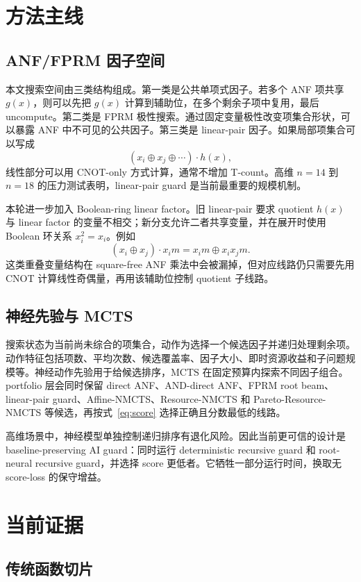 \documentclass[UTF8,fontset=macnew,11pt]{ctexart}
\newcommand{\method}{Resource-NMCTS}
\newcommand{\pareto}{Pareto-Resource-NMCTS}
\newcommand{\mcts}{\ensuremath{\mathrm{MCTS}}}
\begin{document}
\section{方法主线}

\subsection{ANF/FPRM 因子空间}

本文搜索空间由三类结构组成。第一类是公共单项式因子。若多个 ANF 项共享 $g(x)$，则可以先把 $g(x)$ 计算到辅助位，在多个剩余子项中复用，最后 uncompute。第二类是 FPRM 极性搜索。通过固定变量极性改变项集合形状，可以暴露 ANF 中不可见的公共因子。第三类是 linear-pair 因子。如果局部项集合可以写成
\[
  (x_i\oplus x_j\oplus\cdots)\cdot h(x),
\]
线性部分可以用 CNOT-only 方式计算，通常不增加 T-count。高维 $n=14$ 到 $n=18$ 的压力测试表明，linear-pair guard 是当前最重要的规模机制。

本轮进一步加入 Boolean-ring linear factor。旧 linear-pair 要求 quotient $h(x)$ 与 linear factor 的变量不相交；新分支允许二者共享变量，并在展开时使用 Boolean 环关系 $x_i^2=x_i$。例如
\[
  (x_i\oplus x_j)\cdot x_i m = x_i m \oplus x_i x_j m .
\]
这类重叠变量结构在 square-free ANF 乘法中会被漏掉，但对应线路仍只需要先用 CNOT 计算线性奇偶量，再用该辅助位控制 quotient 子线路。

\subsection{神经先验与 MCTS}

搜索状态为当前尚未综合的项集合，动作为选择一个候选因子并递归处理剩余项。动作特征包括项数、平均次数、候选覆盖率、因子大小、即时资源收益和子问题规模等。神经动作先验用于给候选排序，\mcts{} 在固定预算内探索不同因子组合。portfolio 层会同时保留 direct ANF、AND-direct ANF、FPRM root beam、linear-pair guard、Affine-NMCTS、\method{} 和 \pareto{} 等候选，再按式~\eqref{eq:score} 选择正确且分数最低的线路。

高维场景中，神经模型单独控制递归排序有退化风险。因此当前更可信的设计是 baseline-preserving AI guard：同时运行 deterministic recursive guard 和 root-neural recursive guard，并选择 score 更低者。它牺牲一部分运行时间，换取无 score-loss 的保守增益。

\section{当前证据}

\subsection{传统函数切片}
\end{document}
